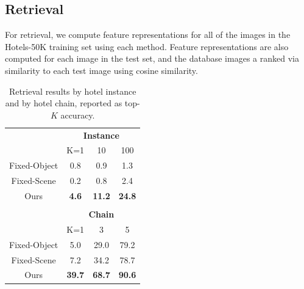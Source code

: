 \subsection{Retrieval}
For retrieval, we compute feature representations
for all of the images in the Hotels-50K training set using
each method. Feature representations are also computed 
for each image in the test set, and the database images
a ranked via similarity to each test image using cosine similarity.

 \begin{table}
    \centering
      \begin{tabular}{c|ccc|}
      \multicolumn{1}{c}{} & \multicolumn{3}{c}{\textbf{Instance}} \\
      \cline{2-4}
      & K=1 & 10 & 100 \\
      \cline{1-4}
      \multicolumn{1}{|c|}{{\sc Fixed-Object}} & 0.8 & 0.9 & 1.3 \\
      \multicolumn{1}{|c|}{{\sc Fixed-Scene}} & 0.2 & 0.8 & 2.4\\
      \multicolumn{1}{|c|}{Ours} & \textbf{4.6} & \textbf{11.2} & \textbf{24.8} \\
      \cline{1-4}
      \multicolumn{4}{c}{} \\
      \multicolumn{1}{c}{} & \multicolumn{3}{c}{\textbf{Chain}} \\
      \cline{2-4}
      & K=1 & 3 & 5 \\
      \cline{1-4}
      \multicolumn{1}{|c|}{{\sc Fixed-Object}} & 5.0 & 29.0 & 79.2 \\
      \multicolumn{1}{|c|}{{\sc Fixed-Scene}} & 7.2 & 34.2 & 78.7\\
      \multicolumn{1}{|c|}{Ours} & \textbf{39.7} & \textbf{68.7} & \textbf{90.6} \\
      \cline{1-4}
      
      \end{tabular}
      \caption{Retrieval results by hotel instance and by hotel chain, reported as top-$K$ accuracy.}
      \label{tab:hotel_vs_chain_comparison}
\end{table}

